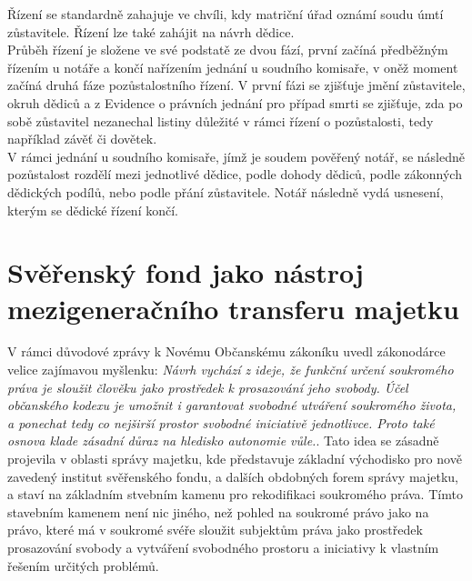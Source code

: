\documentclass{article}
\begin{document}
Řízení se standardně zahajuje ve chvíli, kdy matriční úřad oznámí soudu úmtí zůstavitele. Řízení lze také zahájit na návrh dědice.\\

Průběh řízení je složene ve své podstatě ze dvou fází, první začíná předběžným řízením u notáře a končí nařízením jednání u soudního komisaře, v oněž moment začíná druhá fáze pozůstalostního řízení. V první fázi se zjišťuje jmění zůstavitele, okruh dědiců a z Evidence o právních jednání pro případ smrti se zjišťuje, zda po sobě zůstavitel nezanechal listiny důležité v rámci řízení o pozůstalosti, tedy například závěť či dovětek.\\

V rámci jednání u soudního komisaře, jímž je soudem pověřený notář, se následně pozůstalost rozdělí mezi jednotlivé dědice, podle dohody dědiců, podle zákonných dědických podílů, nebo podle přání zůstavitele. Notář následně vydá usnesení, kterým se dědické řízení končí.\\


\newpage
\thispagestyle{smallertextinheader}

\section{Svěřenský fond jako nástroj mezigeneračního transferu majetku}

V rámci důvodové zprávy k Novému Občanskému zákoníku uvedl zákonodárce velice zajímavou myšlenku: \textit{Návrh vychází z ideje, že funkční určení soukromého práva je sloužit člověku jako prostředek k prosazování jeho svobody. Účel občanského kodexu je umožnit i garantovat svobodné utváření soukromého života, a ponechat tedy co nejširší prostor svobodné iniciativě jednotlivce. Proto také osnova klade zásadní důraz na hledisko autonomie vůle.}. Tato idea se zásadně projevila v oblasti správy majetku, kde představuje základní východisko pro nově zavedený institut svěřenského fondu, a dalších obdobných forem správy majetku, a staví na základním stvebním kamenu pro rekodifikaci soukromého práva. Tímto stavebním kamenem není nic jiného, než pohled na soukromé právo jako na právo, které má v soukromé svéře sloužit subjektům práva jako prostředek prosazování svobody a vytváření svobodného prostoru a iniciativy k vlastním řešením určitých problémů.\\
\end{document}
